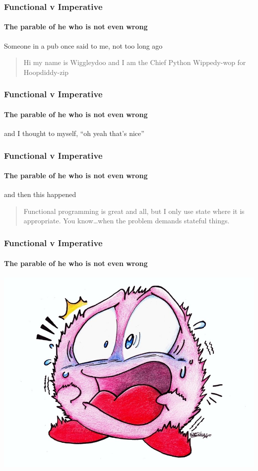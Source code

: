 {

\begin{frame}
\frametitle{Functional v Imperative}
\framesubtitle{The parable of he who is not even wrong}
Someone in a pub once said to me, not too long ago
\begin{quote}
Hi my name is Wiggleydoo and I am the Chief Python Wippedy-wop for Hoopdiddy-zip
\end{quote}
\end{frame}


\begin{frame}
\frametitle{Functional v Imperative}
\framesubtitle{The parable of he who is not even wrong}
and I thought to myself, ``oh yeah that's nice''
\end{frame}


\begin{frame}
\frametitle{Functional v Imperative}
\framesubtitle{The parable of he who is not even wrong}
and then this happened
\begin{quote}
Functional programming is great and all, but I only use state where it is appropriate. You know\ldots when the problem demands stateful things.
\end{quote}
\end{frame}


\begin{frame}
\frametitle{Functional v Imperative}
\framesubtitle{The parable of he who is not even wrong}
\begin{center}
\includegraphics[width=0.7\paperwidth]{image/shock.jpg}
\end{center}
\end{frame}


}
